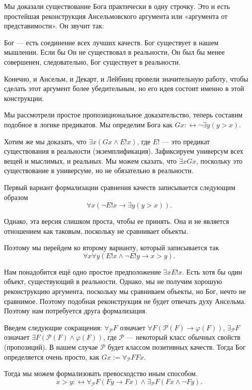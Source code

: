 \documentclass[openany]{book}
\theoremstyle{plain}
\theoremstyle{definition}
\begin{document}
Мы доказали существование Бога практически в одну строчку. Это и есть простейшая реконструкция Ансельмовского аргумента или «аргумента от представимости». Он звучит так:

Бог --- есть соединение всех лучших качеств. Бог существует в нашем мышлении. Если бы Он не существовал в реальности, Он был бы менее совершенен, следовательно, Бог существует в реальности.

Конечно, и Ансельм, и Декарт, и Лейбниц провели значительную работу, чтобы сделать этот аргумент более убедительным, но его идея состоит именно в этой конструкции.

Мы рассмотрели простое пропозициональное доказательство, теперь составим подобное в логике предикатов. Мы определим Бога как \(G x :\leftrightarrow \neg \exists y (y > x)\).

Хотим же мы доказать, что \(\exists x (G x \land E!x)\), где \(E!\) --- это предикат существования в реальности (экземплификация). Зафиксируем универсум всех вещей и мыслимых, и реальных. Мы можем сказать, что \(\exists x Gx\), поскольку это существование в универсуме, но не обязательно в реальности.

Первый вариант формализации сравнения качеств записывается следующим образом
\[\forall x (\neg E! x \to \exists y(y > x)).\]

Однако, эта версия слишком проста, чтобы ее принять. Она и не является отношением как таковым, поскольку не сравнивает объекты.

Поэтому мы перейдем ко второму варианту, который записывается так
\[\forall x \forall y (E!x \land \neg E! y \to x > y).\]

Нам понадобится ещё одно простое предположение \(\exists x E! x\). Есть хотя бы один объект, существующий в реальности. Однако, мы не получим хорошую реконструкцию аргумента, поскольку мы сравниваем объекты, но Бог, нечто не сравнимое. Поэтому подобная реконструкция не будет отвечать духу Ансельма. Поэтому нам потребуется друга формализация.

Введем следующие сокращения: \(\forall_{\mathcal{P}} F\) означает \(\forall F (\mathcal{P}(F) \to \varphi (F))\),
\(\exists_{\mathcal{P}} F\) означает \(\exists F (\mathcal{P}(F) \land \varphi (F))\), где \(\mathcal{P}\) --- некоторый класс обычных свойств (пропозиций). В нашем случае \(\mathcal{P}\) будет классом позитивных качеств. Тогда Бог определяется очень просто, как \(Gx := \forall_{\mathcal{P}} F F x\).

Тогда мы можем формализовать превосходство иным способом. \[x > y :\leftrightarrow \forall_{\mathcal{P}} F (Fy \to Fx) \land \exists_{\mathcal{P}} F (Fx \land \neg F y).\]
\end{document}
